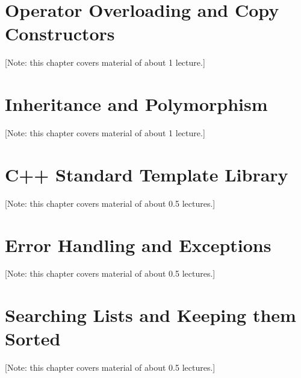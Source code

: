 \documentclass{book}
\begin{document}

%

\chapter{Operator Overloading and Copy Constructors}
\label{chap:overloading}
[Note: this chapter covers material of about 1 lecture.]

%



\chapter{Inheritance and Polymorphism}
\label{chap:inheritance}
[Note: this chapter covers material of about 1 lecture.]

%

\chapter{C++ Standard Template Library}
\label{chap:STL}
[Note: this chapter covers material of about 0.5 lectures.]

%

\chapter{Error Handling and Exceptions}
\label{chap:exceptions}
[Note: this chapter covers material of about 0.5 lectures.]

%

\chapter{Searching Lists and Keeping them Sorted}
\label{chap:searching}
[Note: this chapter covers material of about 0.5 lectures.]

%

\end{document}
